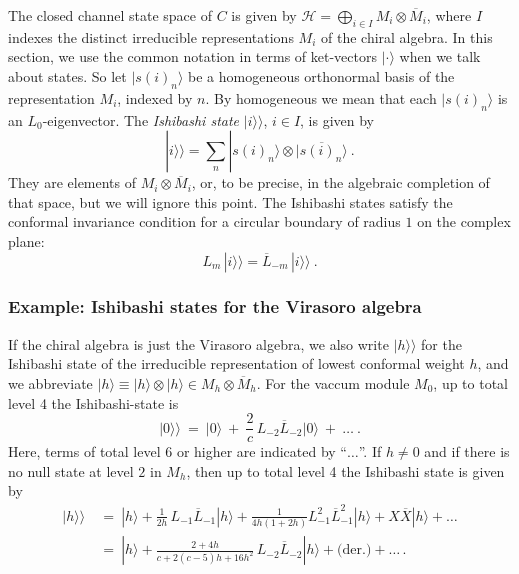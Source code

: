 \documentclass[11pt,a4paper]{article}
\numberwithin{equation}{section}
\def\ket#1{|{#1}\rangle}
\begin{document}
The closed channel state space of $C$ is given by $\mathcal{H} = \bigoplus_{i \in I} M_i \otimes \overline M_i$, where $I$ indexes the distinct irreducible representations $M_i$ of the chiral algebra.
In this section, we use the common notation in terms of ket-vectors $\ket{\cdot}$ when we talk about states.  
So let $\ket{s(i)_n}$ be a homogeneous orthonormal basis of the representation $M_i$, indexed by $n$. By homogeneous we mean that each $\ket{s(i)_n}$ is an $L_0$-eigenvector. The \textit{Ishibashi state} $\ket{i}\!\rangle$, $i \in I$, is given by \cite{Ishibashi:1988kg}
%
\begin{equation}
\ket{i}\!\rangle = \sum_{n} \ket{s(i)_n} \otimes \overline{\ket{s(i)_n}} ~.
\end{equation}
They are elements of $M_i \otimes \overline M_i$, or, to be precise, in the algebraic completion of that space, but we will ignore this point. The Ishibashi states satisfy the conformal invariance condition for a circular boundary of radius $1$ on the complex plane:
\begin{equation}
L_m \, \ket{i}\!\rangle = \overline L_{-m} \, \ket{i}\!\rangle ~.
\end{equation}

\subsubsection*{Example: Ishibashi states for the Virasoro algebra}\label{sec:ExVirIshibashi}

If the chiral algebra is just the Virasoro algebra, we also write $\ket{h}\!\rangle$ for the Ishibashi state of the irreducible representation of lowest conformal weight $h$, and we abbreviate $\ket{h} \equiv \ket{h} \otimes \ket{h} \in M_h \otimes \overline M_h$. For the vaccum module $M_0$, up to total level 4 the Ishibashi-state is
\begin{equation}
\ket{0}\!\rangle 
~=~ 
\ket{0} ~+~ \frac{2}{c}\,L_{-2} \overline L_{-2} \ket{0} ~+~ \dots ~.
\label{eq:vacIshi}
\end{equation}
Here, terms of total level 6 or higher are indicated by ``$\dots$''.
If $h \neq 0$ and if there is no null state at level $2$ in $M_h$, then up to total level 4 the Ishibashi state is given by
%
\begin{align}
\ket{h}\!\rangle 
~&=~ 
\ket{h} 
+ 
\frac{1}{2h}\,L_{-1} \overline L_{-1} \ket{h} 
+ 
\frac{1}{4 h(1+2h)} L_{-1}^2\overline{L}_{-1}^2 \ket{h} 
+ X\overline{X}  \ket{h} 
+ \dots \nonumber \\
&=~ \ket{h} 
+
\frac{2+4h}{c+2(c-5)h+16h^2}\,L_{-2} \overline L_{-2} \ket{h} 
+
\text{(der.)} + \dots\,.\label{eq:primIshi}
\end{align}
\end{document}
